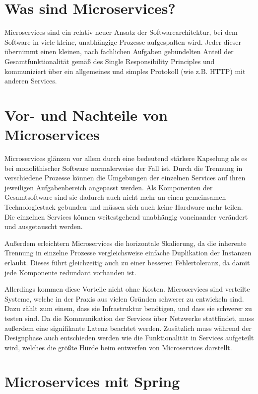 \documentclass{article}
\begin{document}
\section{Was sind Microservices?}

Microservices sind ein relativ neuer Ansatz der Softwarearchitektur, bei dem Software in viele kleine, unabhängige Prozesse aufgespalten wird\cite{OMA}. Jeder dieser übernimmt einen kleinen, nach fachlichen Aufgaben gebündelten Anteil der Gesamtfunktionalität gemäß des Single Responsibility Principles und kommuniziert über ein allgemeines und simples Protokoll (wie z.B. HTTP) mit anderen Services\cite{EMMA}.

\section{Vor- und Nachteile von Microservices}

Microservices glänzen vor allem durch eine bedeutend stärkere Kapselung als es bei monolithischer Software normalerweise der Fall ist. Durch die Trennung in verschiedene Prozesse können die Umgebungen der einzelnen Services auf ihren jeweiligen Aufgabenbereich angepasst werden. Als Komponenten der Gesamtsoftware sind sie dadurch auch nicht mehr an einen gemeinsamen Technologiestack gebunden und müssen sich auch keine Hardware mehr teilen. Die einzelnen Services können weitestgehend unabhängig voneinander verändert und ausgetauscht werden.

Außerdem erleichtern Microservices die horizontale Skalierung, da die inherente Trennung in einzelne Prozesse vergleichsweise einfache Duplikation der Instanzen erlaubt. Dieses führt gleichzeitig auch zu einer besseren Fehlertoleranz, da damit jede Komponente redundant vorhanden ist.

Allerdings kommen diese Vorteile nicht ohne Kosten. Microservices sind verteilte Systeme, welche in der Praxis aus vielen Gründen schwerer zu entwickeln sind. Dazu zählt zum einem, dass sie Infrastruktur benötigen, und dass sie schwerer zu testen sind. Da die Kommunikation der Services über Netzwerke stattfindet, muss außerdem eine signifikante Latenz beachtet werden. Zusätzlich muss während der Designphase auch entschieden werden wie die Funktionalität in Services aufgeteilt wird, welches die größte Hürde beim entwerfen von Microservices darstellt.\cite{OMA}

\section{Microservices mit Spring}
\end{document}
